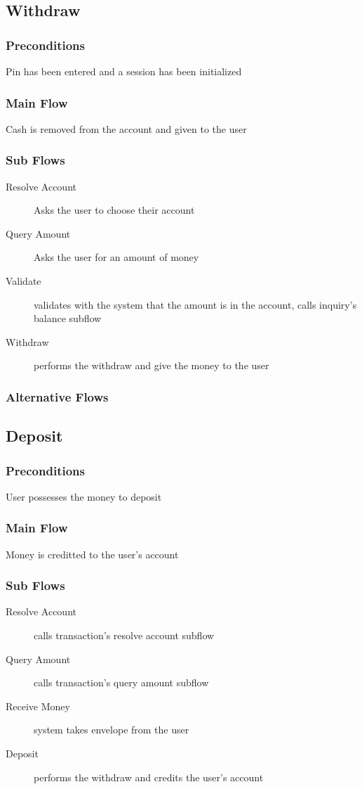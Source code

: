 \documentclass[10pt,letterpaper,notitlepage]{article}
\begin{document}
\subsection{Withdraw}
\subsubsection{Preconditions}
Pin has been entered and a session has been initialized
\subsubsection{Main Flow}
Cash is removed from the account and given to the user
\subsubsection{Sub Flows}
\begin{description}
\item[Resolve Account] Asks the user to choose their account
\item[Query Amount] Asks the user for an amount of money
\item[Validate] validates with the system that the amount is in the account, calls inquiry's balance subflow
\item[Withdraw] performs the withdraw and give the money to the user
\end{description}
\subsubsection{Alternative Flows}


\subsection{Deposit}
\subsubsection{Preconditions}
User possesses the money to deposit
\subsubsection{Main Flow}
Money is creditted to the user's account
\subsubsection{Sub Flows}
\begin{description}
\item[Resolve Account] calls transaction's resolve account subflow
\item[Query Amount]  calls transaction's query amount subflow
\item[Receive Money] system takes envelope from the user
\item[Deposit]  performs the withdraw and credits the user's account
\end{description}
\end{document}
